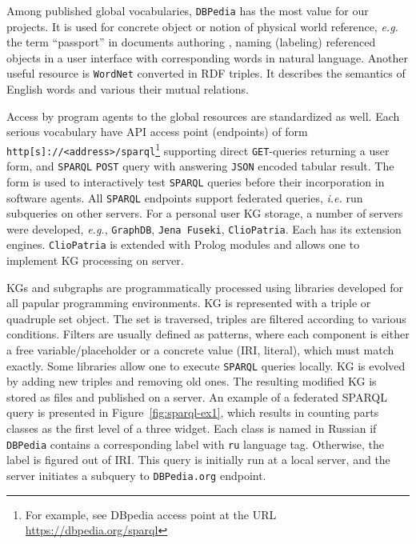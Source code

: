\documentclass[a4paper]{jctart19a}
\begin{document}
Among published global vocabularies, \texttt{DBPedia} has the most value for our projects.  It is used for concrete object or notion of physical world reference, \emph{e.g.} the term ``passport'' in documents authoring \cite{zont19}, naming (labeling) referenced objects in a user interface with corresponding words in natural language.  Another useful resource is \texttt{WordNet} converted in RDF triples.  It describes the semantics of English words and various their mutual relations.

Access by program agents to the global resources are standardized as well.  Each serious vocabulary have API access point (endpoints) of form
\verb|http[s]://<address>/sparql|\footnote{For example, see DBpedia access point at the URL \url{https://dbpedia.org/sparql}} supporting direct \texttt{GET}-queries returning a user form, and \texttt{SPARQL} \texttt{POST} query with answering \texttt{JSON} encoded tabular result.  The form is used to interactively test \texttt{SPARQL} queries before their incorporation in software agents.  All \texttt{SPARQL} endpoints support federated queries, \emph{i.e.} run subqueries on other servers.   For a personal user KG storage, a number of servers were developed, \emph{e.g.}, \texttt{GraphDB}, \texttt{Jena Fuseki}, \texttt{ClioPatria}.  Each has its extension engines.  \texttt{ClioPatria} is extended with Prolog modules and allows one to implement KG processing on server.

KGs and subgraphs are programmatically processed using libraries developed for all papular programming environments.  KG is represented with a triple or quadruple set object.  The set is traversed, triples are filtered according to various conditions.  Filters are usually defined as patterns, where each component is either a free variable/placeholder or a concrete value (IRI, literal), which must match exactly.   Some libraries allow one to execute \texttt{SPARQL} queries locally.  KG is evolved by adding new triples and removing old ones.  The resulting modified KG is stored as files and published on a server.  An example of a federated SPARQL query is presented in Figure~\ref{fig:sparql-ex1}, which results in counting parts classes as the first level of a three widget.  Each class is named in Russian if \texttt{DBPedia} contains a corresponding label with \texttt{ru} language tag.  Otherwise, the label is figured out of IRI.  This query is initially run at a local server, and the server initiates a subquery to \texttt{DBPedia.org} endpoint.
\end{document}

